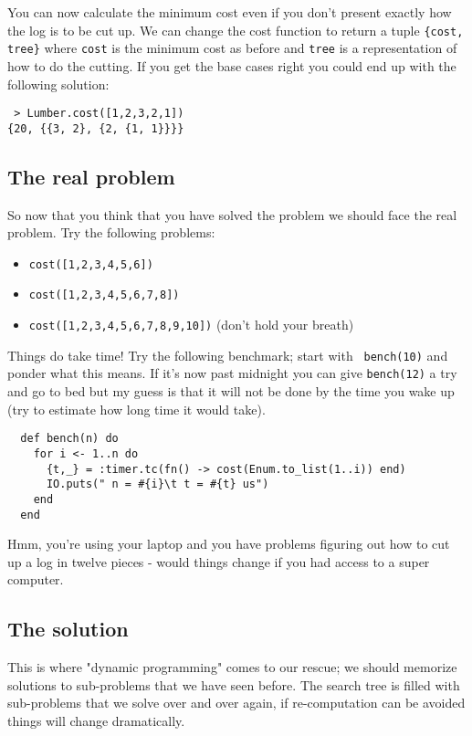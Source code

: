 \documentclass[a4paper,11pt]{article}
\begin{document}
 \noindent You can now calculate the minimum cost even if you don't
 present exactly how the log is to be cut up. We can change the cost
 function to return a tuple {\tt \{cost, tree\}} where {\tt cost} is
 the minimum cost as before and {\tt tree} is a representation of how
 to do the cutting. If you get the base cases right you could end up
 with the following solution:
 
\begin{verbatim}
 > Lumber.cost([1,2,3,2,1])
{20, {{3, 2}, {2, {1, 1}}}}
\end{verbatim}

\subsection*{The real problem}

So now that you think that you have solved the problem we should face
the real problem. Try the following problems:

\begin{itemize}
\item {\tt cost([1,2,3,4,5,6])}
\item {\tt cost([1,2,3,4,5,6,7,8])}
\item {\tt cost([1,2,3,4,5,6,7,8,9,10])} (don't hold your breath)
\end{itemize}

Things do take time! Try the following benchmark; start with {\tt
  bench(10)} and ponder what this means. If it's now past midnight you
can give {\tt bench(12)} a try and go to bed but my guess is that it
will not be done by the time you wake up (try to estimate how long
time it would take).

\begin{verbatim}
  def bench(n) do
    for i <- 1..n do
      {t,_} = :timer.tc(fn() -> cost(Enum.to_list(1..i)) end)
      IO.puts(" n = #{i}\t t = #{t} us")
    end
  end
\end{verbatim}

Hmm, you're using your laptop and you have problems figuring out how
to cut up a log in twelve pieces - would things change if you had
access to a super computer.


\subsection*{The solution}

This is where "dynamic programming" comes to our rescue; we should
memorize solutions to sub-problems that we have seen before. The search
tree is filled with sub-problems that we solve over and over again, if
re-computation can be avoided things will change dramatically.
\end{document}
